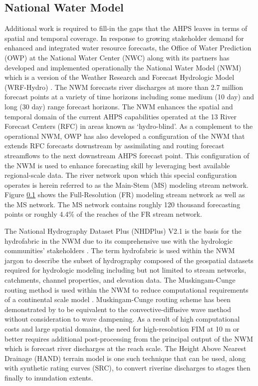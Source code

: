 \documentclass[draft]{dependencies/agujournal2019}
\begin{document}
\subsection{National Water Model}
\label{ssec:national_water_model}
%
Additional work is required to fill-in the gaps that the AHPS leaves in terms of spatial and temporal coverage.
In response to growing stakeholder demand for enhanced and integrated water resource forecasts, the Office of Water Prediction (OWP) at the National Water Center (NWC) along with its partners has developed and implemented operationally the National Water Model (NWM) which is a version of the Weather Research and Forecast Hydrologic Model (WRF-Hydro) \cite{gochis2018wrf,cosgrove2019evolution}. 
The NWM forecasts river discharges at more than 2.7 million forecast points at a variety of time horizons including some medium (10 day) and long (30 day) range forecast horizons.
The NWM enhances the spatial and temporal domain of the current AHPS capabilities operated at the 13 River Forecast Centers (RFC) in areas known as `hydro-blind'.
As a complement to the operational NWM, OWP has also developed a configuration of the NWM that extends RFC forecasts downstream by assimilating and routing forecast streamflows to the next downstream AHPS forecast point.
This configuration of the NWM is used to enhance forecasting skill by leveraging best available regional-scale data.
The river network upon which this special configuration operates is herein referred to as the Main-Stem (MS) modeling stream network.
Figure \ref{ssec:national_water_model} shows the Full-Resolution (FR) modeling stream network as well as the MS network.
The MS network contains roughly 120 thousand forecasting points or roughly 4.4\% of the reaches of the FR stream network.

The National Hydrography Dataset Plus (NHDPlus) V2.1 is the basis for the hydrofabric in the NWM due to its comprehensive use with the hydrologic communities' stakeholders \cite{mckay2012nhdplus}. 
The term hydrofabric is used within the NWM jargon to describe the subset of hydrography composed of the geospatial datasets required for hydrologic modeling including but not limited to stream networks, catchments, channel properties, and elevation data. 
The Muskingam-Cunge routing method is used within the NWM to reduce computational requirements of a continental scale model \cite{bedient2008hydrology,ponce1994variable,gochis2018wrf}.
Muskingam-Cunge routing scheme has been demonstrated by  to be equivalent to the convective-diffusive wave method without consideration to wave dampening.
As a result of high computational costs and large spatial domains, the need for high-resolution FIM at 10 m or better requires additional post-processing from the principal output of the NWM which is forecast river discharges at the reach scale. The Height Above Nearest Drainage (HAND) terrain model is one such technique that can be used, along with synthetic rating curves (SRC), to convert riverine discharges to stages then finally to inundation extents.
%
\end{document}
